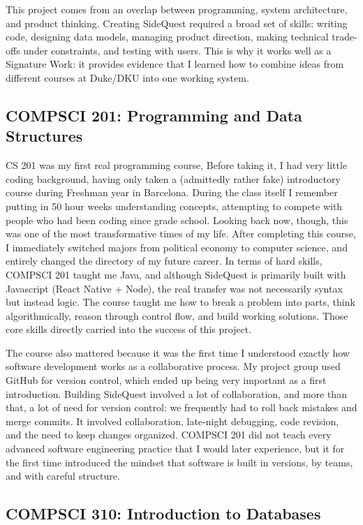 \documentclass[12pt]{article}
\begin{document}
This project comes from an overlap between programming, system architecture, and product thinking. Creating SideQuest required a broad set of skills: writing code, designing data models, managing product direction, making technical trade-offs under constraints, and testing with users. This is why it works well as a Signature Work: it provides evidence that I learned how to combine ideas from different courses at Duke/DKU into one working system.

\subsection*{COMPSCI 201: Programming and Data Structures}

CS 201 was my first real programming course, Before taking it, I had very little coding background, having only taken a (admittedly rather fake) introductory course during Freshman year in Barcelona. During the class itself I remember putting in 50 hour weeks understanding concepts, attempting to compete with people who had been coding since grade school. Looking back now, though, this was one of the most transformative times of my life. After completing this course, I immediately switched majors from political economy to computer science, and entirely changed the directory of my future career. In terms of hard skills, COMPSCI 201 taught me Java, and although SideQuest is primarily built with Javascript (React Native + Node), the real transfer was not necessarily syntax but instead logic. The course taught me how to break a problem into parts, think algorithmically, reason through control flow, and build working solutions. Those core skills directly carried into the success of this project.

The course also mattered because it was the first time I understood exactly how software development works as a collaborative process. My project group used GitHub for version control, which ended up being very important as a first introduction. Building SideQuest involved a lot of collaboration, and more than that, a lot of need for version control: we frequently had to roll back mistakes and merge commits. It involved collaboration, late-night debugging, code revision, and the need to keep changes organized. COMPSCI 201 did not teach every advanced software engineering practice that I would later experience, but it for the first time introduced the mindset that software is built in versions, by teams, and with careful structure.

\subsection*{COMPSCI 310: Introduction to Databases}
\end{document}
